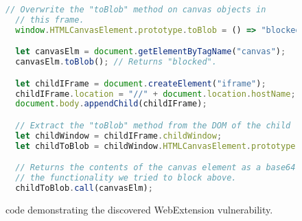 \begin{figure}[t!]
  \centering
  \lstset{numbers=left,xleftmargin=2em,frame=single,framexleftmargin=1.5em}
  \begin{lstlisting}[language=javascript]
  // Overwrite the "toBlob" method on canvas objects in
  // this frame.
  window.HTMLCanvasElement.prototype.toBlob = () => "blocked";

  let canvasElm = document.getElementByTagName("canvas");
  canvasElm.toBlob(); // Returns "blocked".

  let childIFrame = document.createElement("iframe");
  childIFrame.location = "//" + document.location.hostName;
  document.body.appendChild(childIFrame);

  // Extract the "toBlob" method from the DOM of the child frame.
  let childWindow = childIFrame.childWindow;
  let childToBlob = childWindow.HTMLCanvasElement.prototype.toBlob;

  // Returns the contents of the canvas element as a base64 string,
  // the functionality we tried to block above.
  childToBlob.call(canvasElm);
  \end{lstlisting}
  \caption{\JS code demonstrating the discovered WebExtension vulnerability.}
  \label{fig:webex-vulnerability-js}
\end{figure}
